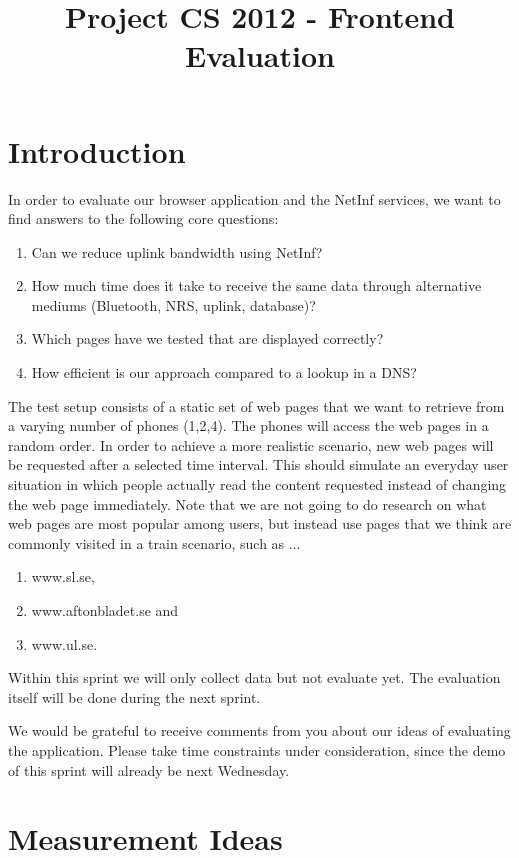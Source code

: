\documentclass[12pt,a4paper]{article}
\title{Project CS 2012 - Frontend Evaluation}
\begin{document}
\maketitle

\section{Introduction}
In order to evaluate our browser application and the NetInf services, 
we want to find answers to the following core questions:

\begin{enumerate}
\item Can we reduce uplink bandwidth using NetInf?
\item How much time does it take to receive the same data through alternative mediums (Bluetooth, NRS, uplink, database)?
\item Which pages have we tested that are displayed correctly?
\item How efficient is our approach compared to a lookup in a DNS?
\end{enumerate}

The test setup consists of a static set of web pages that we want to retrieve from a varying number of phones (1,2,4). The phones will access the web pages in a random order. In order to achieve a more realistic scenario, new web pages will be requested after a selected time interval. This should simulate an everyday user situation in which people actually read
the content requested instead of changing the web page immediately. Note that we are not going to do research on what web pages are most popular among users, but instead use pages that we think are commonly visited in a train scenario, such as $\dots$
\pagebreak
\begin{enumerate}
\item www.sl.se,
\item www.aftonbladet.se and
\item www.ul.se.
\end{enumerate}

Within this sprint we will only collect data but not evaluate yet. The evaluation itself will be done during the next sprint.

We would be grateful to receive comments from you about our ideas of evaluating the application. Please take time constraints under consideration, since the demo of this sprint will already be next Wednesday. 

\section{Measurement Ideas}
\end{document}
